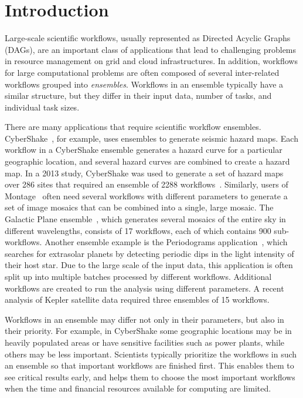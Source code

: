\documentclass[preprint,5p]{elsarticle}
\begin{document}
\section{Introduction}
\label{sec:intro}

Large-scale scientific workflows, usually represented as Directed Acyclic Graphs
(DAGs), are an important class of applications that lead to challenging problems
in resource management on grid and cloud infrastructures. In addition, workflows
for large computational problems are often composed of several inter-related
workflows grouped into {\em ensembles}. Workflows in an ensemble typically have
a similar structure, but they differ in their input data, number of tasks, and
individual task sizes.

There are many applications that require scientific workflow ensembles.
CyberShake~\cite{Callaghan2011}, for example, uses ensembles to generate seismic
hazard maps.  Each workflow in a CyberShake ensemble generates a hazard curve
for a particular geographic location, and several hazard curves are combined to
create a hazard map.  In a 2013 study, CyberShake was used to generate a set
of hazard maps over 286 sites that required an ensemble of 2288
workflows~\cite{CyberShake13.4}. Similarly, users of Montage~\cite{Deelman2008}
often need several workflows  with different parameters to generate a set of
image mosaics that can be combined  into a single, large mosaic. The Galactic
Plane ensemble~\cite{GalacticPlane}, which generates several mosaics of the
entire sky in different wavelengths, consists of 17 workflows,
each of which contains 900 sub-workflows.  Another ensemble example is the
Periodograms application~\cite{Vockler2011}, which searches for extrasolar
planets by detecting periodic dips in the light intensity of their host star.
Due to the large scale of the input data, this application is often split up
into multiple batches processed by different workflows. Additional workflows are
created to run the analysis using different parameters. A recent analysis of
Kepler satellite data required three ensembles of 15 workflows.

Workflows in an ensemble may differ not only in their parameters, but also in
their priority. For example, in CyberShake some geographic locations may be in heavily
populated areas or have sensitive facilities such as power plants, while others
may be less important. Scientists typically prioritize the workflows in such
an ensemble so that important workflows are finished first. This enables them
to see critical results early, and helps them to choose the most important
workflows when the time and financial resources available for computing are
limited.
\end{document}
